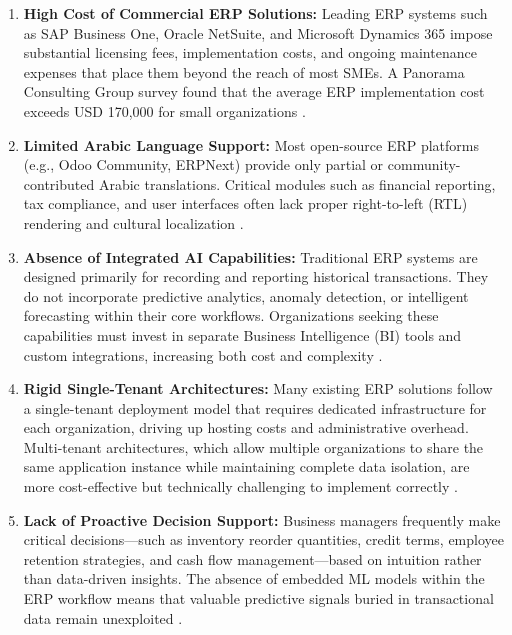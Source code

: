 \documentclass[12pt,a4paper]{report}
\begin{document}
\begin{enumerate}[label=\arabic*.]
  \item \textbf{High Cost of Commercial ERP Solutions:} Leading ERP systems such as SAP Business One, Oracle NetSuite, and Microsoft Dynamics 365 impose substantial licensing fees, implementation costs, and ongoing maintenance expenses that place them beyond the reach of most SMEs. A Panorama Consulting Group survey found that the average ERP implementation cost exceeds USD 170,000 for small organizations \citep{panorama2023}.

  \item \textbf{Limited Arabic Language Support:} Most open-source ERP platforms (e.g., Odoo Community, ERPNext) provide only partial or community-contributed Arabic translations. Critical modules such as financial reporting, tax compliance, and user interfaces often lack proper right-to-left (RTL) rendering and cultural localization \citep{alkraiji2020}.

  \item \textbf{Absence of Integrated AI Capabilities:} Traditional ERP systems are designed primarily for recording and reporting historical transactions. They do not incorporate predictive analytics, anomaly detection, or intelligent forecasting within their core workflows. Organizations seeking these capabilities must invest in separate Business Intelligence (BI) tools and custom integrations, increasing both cost and complexity \citep{lee2020erp}.

  \item \textbf{Rigid Single-Tenant Architectures:} Many existing ERP solutions follow a single-tenant deployment model that requires dedicated infrastructure for each organization, driving up hosting costs and administrative overhead. Multi-tenant architectures, which allow multiple organizations to share the same application instance while maintaining complete data isolation, are more cost-effective but technically challenging to implement correctly \citep{bezemer2010multi}.

  \item \textbf{Lack of Proactive Decision Support:} Business managers frequently make critical decisions---such as inventory reorder quantities, credit terms, employee retention strategies, and cash flow management---based on intuition rather than data-driven insights. The absence of embedded ML models within the ERP workflow means that valuable predictive signals buried in transactional data remain unexploited \citep{provost2013data}.


\end{enumerate}
\end{document}
